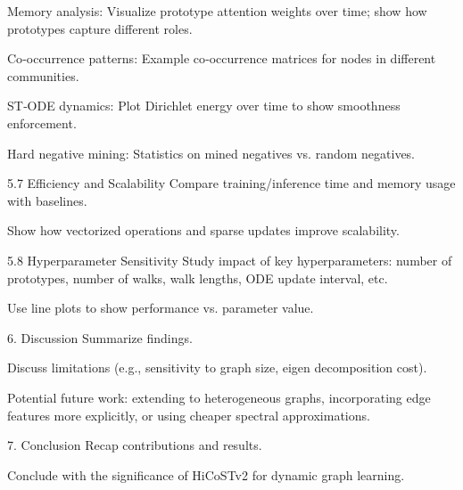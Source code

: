 \documentclass{report}
\begin{document}
Memory analysis: Visualize prototype attention weights over time; show how prototypes capture different roles.

Co‑occurrence patterns: Example co‑occurrence matrices for nodes in different communities.

ST‑ODE dynamics: Plot Dirichlet energy over time to show smoothness enforcement.

Hard negative mining: Statistics on mined negatives vs. random negatives.

5.7 Efficiency and Scalability
Compare training/inference time and memory usage with baselines.

Show how vectorized operations and sparse updates improve scalability.

5.8 Hyperparameter Sensitivity
Study impact of key hyperparameters: number of prototypes, number of walks, walk lengths, ODE update interval, etc.

Use line plots to show performance vs. parameter value.

6. Discussion
Summarize findings.

Discuss limitations (e.g., sensitivity to graph size, eigen decomposition cost).

Potential future work: extending to heterogeneous graphs, incorporating edge features more explicitly, or using cheaper spectral approximations.

7. Conclusion
Recap contributions and results.

Conclude with the significance of HiCoSTv2 for dynamic graph learning.
\end{document}
